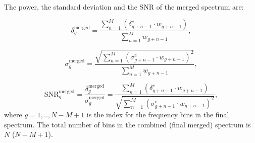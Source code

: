 The power, the standard deviation and the SNR of the merged spectrum are:


\begin{equation}
    \label{eq:merged_power}
    \delta_{g}^\text{merged} = \frac{ \sum_{n = 1}^{M}\left(\delta_{g+n-1}^{c} \cdot {w_{g+n-1}}\right)}{\sum_{n = 1}^{M} {w_{g+n-1}}},
\end{equation}

\begin{equation}
    \label{eq:merged_sigma}
    \sigma_{g}^\text{merged} =  \frac{ \sqrt{\sum_{n = 1}^{M} \left(\sigma_{g+n-1}^{c} \cdot {w_{g+n-1}}\right)^2}}{\sum_{n = 1}^{M} {w_{g+n-1}}},
\end{equation}

\begin{equation}
    \label{eq:merged_snr}
    \text{SNR}_{g}^\text{merged} = \frac{\delta^\text{merged}_{g}}{\sigma^\text{merged}_{g}} = \frac{\sum_{n = 1}^{M}\left(\delta_{g+n-1}^{c} \cdot {w_{g+n-1}}\right)}{ \sqrt{\sum_{n = 1}^{M} \left(\sigma_{g+n-1}^{c} \cdot {w_{g+n-1}}\right)^2}},
\end{equation}
where $g = 1,..,N-M+1$ is the index for the frequency bins in the final spectrum.  
The total number of bins in the combined (final merged) spectrum is $N$ ($N-M+1$). 




